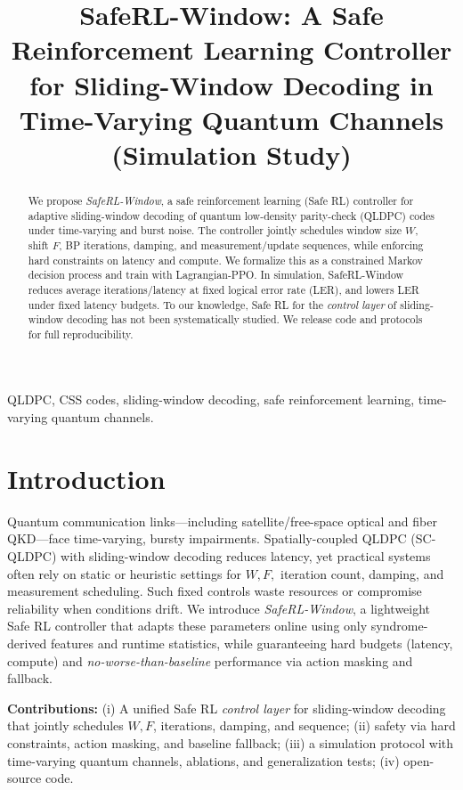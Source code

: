 \documentclass[conference]{IEEEtran}
\title{SafeRL-Window: A Safe Reinforcement Learning Controller for Sliding-Window Decoding in Time-Varying Quantum Channels (Simulation Study)}
\author{
\IEEEauthorblockN{Your Name}
\IEEEauthorblockA{
Affiliation\\
Email: you@example.com}
}
\begin{document}
\maketitle

\begin{abstract}
We propose \emph{SafeRL-Window}, a safe reinforcement learning (Safe RL) controller for adaptive sliding-window decoding of quantum low-density parity-check (QLDPC) codes under time-varying and burst noise. The controller jointly schedules window size $W$, shift $F$, BP iterations, damping, and measurement/update sequences, while enforcing hard constraints on latency and compute. We formalize this as a constrained Markov decision process and train with Lagrangian-PPO. In simulation, SafeRL-Window reduces average iterations/latency at fixed logical error rate (LER), and lowers LER under fixed latency budgets. To our knowledge, Safe RL for the \emph{control layer} of sliding-window decoding has not been systematically studied. We release code and protocols for full reproducibility.
\end{abstract}

\begin{IEEEkeywords}
QLDPC, CSS codes, sliding-window decoding, safe reinforcement learning, time-varying quantum channels.
\end{IEEEkeywords}

\section{Introduction}
Quantum communication links---including satellite/free-space optical and fiber QKD---face time-varying, bursty impairments. Spatially-coupled QLDPC (SC-QLDPC) with sliding-window decoding reduces latency, yet practical systems often rely on static or heuristic settings for $W,F,$ iteration count, damping, and measurement scheduling. Such fixed controls waste resources or compromise reliability when conditions drift. We introduce \emph{SafeRL-Window}, a lightweight Safe RL controller that adapts these parameters online using only syndrome-derived features and runtime statistics, while guaranteeing hard budgets (latency, compute) and \emph{no-worse-than-baseline} performance via action masking and fallback.

\textbf{Contributions:}
(i) A unified Safe RL \emph{control layer} for sliding-window decoding that jointly schedules $W,F$, iterations, damping, and sequence; (ii) safety via hard constraints, action masking, and baseline fallback; (iii) a simulation protocol with time-varying quantum channels, ablations, and generalization tests; (iv) open-source code.
\end{document}
